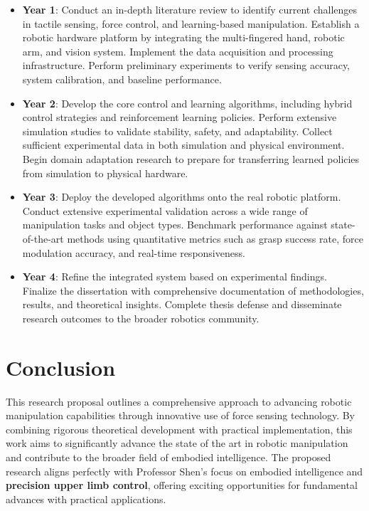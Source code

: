 \documentclass[11pt,a4paper]{article}
\begin{document}
\begin{itemize}
    \item \textbf{Year 1}: Conduct an in-depth literature review to identify current challenges in tactile sensing, force control, and learning-based manipulation. Establish a robotic hardware platform by integrating the multi-fingered hand, robotic arm, and vision system. Implement the data acquisition and processing infrastructure. Perform preliminary experiments to verify sensing accuracy, system calibration, and baseline performance.
    
    \item \textbf{Year 2}: Develop the core control and learning algorithms, including hybrid control strategies and reinforcement learning policies. Perform extensive simulation studies to validate stability, safety, and adaptability. Collect sufficient experimental data in both simulation and physical environment. Begin domain adaptation research to prepare for transferring learned policies from simulation to physical hardware.
    
    \item \textbf{Year 3}: Deploy the developed algorithms onto the real robotic platform. Conduct extensive experimental validation across a wide range of manipulation tasks and object types. Benchmark performance against state-of-the-art methods using quantitative metrics such as grasp success rate, force modulation accuracy, and real-time responsiveness.

    \item \textbf{Year 4}: Refine the integrated system based on experimental findings. Finalize the dissertation with comprehensive documentation of methodologies, results, and theoretical insights. Complete thesis defense and disseminate research outcomes to the broader robotics community.
\end{itemize}

\section{Conclusion}
This research proposal outlines a comprehensive approach to advancing robotic manipulation capabilities through innovative use of force sensing technology. By combining rigorous theoretical development with practical implementation, this work aims to significantly advance the state of the art in robotic manipulation and contribute to the broader field of embodied intelligence. The proposed research aligns perfectly with Professor Shen's focus on embodied intelligence and \textbf{precision upper limb control}, offering exciting opportunities for fundamental advances with practical applications.

\vspace{100pt}



\end{document}
